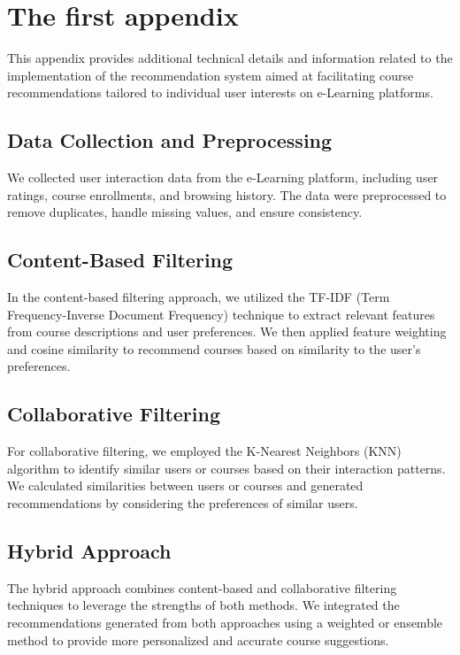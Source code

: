 \chapter{The first appendix}

This appendix provides additional technical details and information 
related to the implementation of the \textsf{recommendation system} aimed at 
facilitating course recommendations tailored to individual user 
interests on e-Learning platforms.

\section{Data Collection and Preprocessing}

We collected user interaction data from the e-Learning platform, 
including user ratings, course enrollments, and browsing history. 
The data were preprocessed to remove duplicates, handle missing 
values, and ensure consistency.

\section{Content-Based Filtering}

In the content-based filtering approach, we utilized the TF-IDF 
(Term Frequency-Inverse Document Frequency) technique to extract 
relevant features from course descriptions and user preferences. 
We then applied feature weighting and cosine similarity to 
recommend courses based on similarity to the user's preferences.

\section{Collaborative Filtering}

For collaborative filtering, we employed the K-Nearest Neighbors 
(KNN) algorithm to identify similar users or courses based on their 
interaction patterns. We calculated similarities between users or 
courses and generated recommendations by considering the preferences 
of similar users.

\section{Hybrid Approach}

The hybrid approach combines content-based and collaborative filtering 
techniques to leverage the strengths of both methods. We integrated the 
recommendations generated from both approaches using a weighted or ensemble 
method to provide more personalized and accurate course suggestions.


